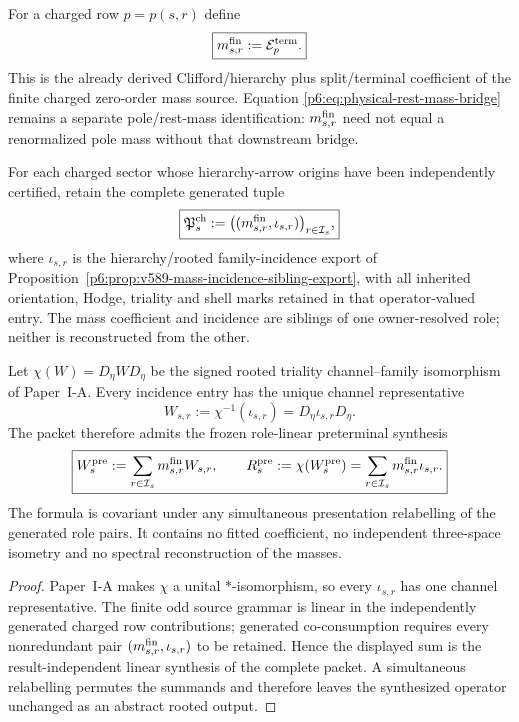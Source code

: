 \documentclass[12pt,a4paper]{article}
\begin{document}
\begin{definition}
\label{p6:def:v590-finite-charged-mass-coefficient}
For a charged row $p=p(s,r)$ define
\[
 \boxed{m^{\rm fin}_{s,r}:=\mathcal E_{p}^{\rm term}.}
\]
This is the already derived Clifford/hierarchy plus split/terminal coefficient
of the finite charged zero-order mass source.  Equation
\eqref{p6:eq:physical-rest-mass-bridge} remains a separate pole/rest-mass
identification: $m^{\rm fin}_{s,r}$ need not equal a renormalized pole mass
without that downstream bridge.
\end{definition}

\begin{definition}
\label{p6:def:v590-charged-mass-incidence-packet}
For each charged sector whose hierarchy-arrow origins have been
independently certified, retain the complete generated tuple
\[
 \boxed{
 \mathfrak P_s^{\rm ch}
 :=\bigl((m^{\rm fin}_{s,r},\iota_{s,r})\bigr)_{r\in\mathcal I_s},}
\]
where $\iota_{s,r}$ is the hierarchy/rooted family-incidence export of
Proposition~\ref{p6:prop:v589-mass-incidence-sibling-export}, with all inherited
orientation, Hodge, triality and shell marks retained in that operator-valued
entry.  The mass coefficient and incidence are siblings of one owner-resolved
role; neither is reconstructed from the other.
\end{definition}

\begin{theorem}
\label{p6:thm:v590-charged-channel-representatives}
Let $\chi(W)=D_\eta W D_\eta$ be the signed rooted triality
channel--family isomorphism of Paper~I-A.  Every incidence entry has the unique
channel representative
\[
 \boxed{W_{s,r}:=\chi^{-1}(\iota_{s,r})=D_\eta\iota_{s,r}D_\eta.}
\]
The packet therefore admits the frozen role-linear preterminal synthesis
\[
 \boxed{
 W_s^{\rm pre}:=\sum_{r\in\mathcal I_s}m^{\rm fin}_{s,r}W_{s,r},
 \qquad
 R_s^{\rm pre}:=\chi(W_s^{\rm pre})
 =\sum_{r\in\mathcal I_s}m^{\rm fin}_{s,r}\iota_{s,r}.}
\]
The formula is covariant under any simultaneous presentation relabelling of
the generated role pairs.  It contains no fitted coefficient, no independent
three-space isometry and no spectral reconstruction of the masses.
\end{theorem}

\begin{proof}
Paper~I-A makes $\chi$ a unital $*$-isomorphism, so every $\iota_{s,r}$ has
one channel representative.  The finite odd source grammar is linear in the
independently generated charged row contributions; generated co-consumption
requires every nonredundant pair $(m^{\rm fin}_{s,r},\iota_{s,r})$ to be
retained.  Hence the displayed sum is the result-independent linear synthesis
of the complete packet.  A simultaneous relabelling permutes the summands and
therefore leaves the synthesized operator unchanged as an abstract rooted
output.
\end{proof}
\end{document}
